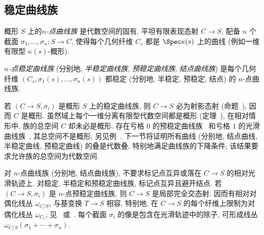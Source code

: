 \subsection{稳定曲线族}\label{src:6.3.4-subsection}
\begin{definition}\label{src:6.3.20}
概形 $S$ 上的\textit{$n$-点曲线族} 是代数空间的固有, 平坦有限表现态射 $C\to\allowbreak S$, 配备 $n$ 个截面 $\sigma_1,\allowbreak \ldots,\allowbreak \sigma_n:S\to\allowbreak C$, 使得每个几何纤维 $C_s$ 都是 $\Spec\kappa(s)$ 上的曲线 (例如一维有限型 $\kappa(s)$-概形).

\textit{$n$-点稳定曲线族} (分别地, \textit{半稳定曲线族}, \textit{预稳定曲线族}, \textit{结点曲线族}) 是每个几何纤维 $(C_s,\allowbreak \sigma_1(s),\allowbreak \ldots,\allowbreak \sigma_n(s))$ 都稳定 (分别地, 半稳定, 预稳定, 结点) 的 $n$-点曲线族.
\end{definition}
\begin{remark}[注意]\label{src:6.3.21}
若 $(C\to\allowbreak S,\allowbreak \sigma_i)$ 是概形 $S$ 上的稳定曲线族, 则 $C\to\allowbreak S$ 必为射影态射 (命题~), 因而 $C$ 是概形. 虽然域上每个一维分离有限型代数空间都是概形 (定理~), 在相对情形中, 族的总空间 $C$ 却未必是概形. 存在亏格 $0$ 的预稳定曲线族~\cite[例 2.3]{Ful10} 和亏格 $1$ 的光滑曲线族~\cite[XIII.3.2]{Ray70}, 其总空间不是概形; 另见例~. 下一节将证明所有曲线 (分别地, 结点曲线, 半稳定曲线, 预稳定曲线) 的叠是代数叠, 特别地满足曲线族的下降条件; 该结果要求允许族的总空间为代数空间.
\end{remark}
对 $n$-点曲线族 (分别地, 结点曲线族), 不要求标记点互异或落在 $C\to\allowbreak S$ 的相对光滑轨迹上. 对稳定, 半稳定和预稳定曲线族, 标记点互异且避开结点. 若 $(C\to\allowbreak S,\allowbreak \sigma_i)$ 是 $n$-点预稳定曲线族, 则 $C\to\allowbreak S$ 是局部完全交态射. 因而有相对对偶化线丛 $\omega_{C/S}$, 与基变换 $T\to\allowbreak S$ 相容, 特别地, 在 $C\to\allowbreak S$ 的每个纤维上限制为对偶化线丛 $\omega_{C_s}$; 见~\cite{Har66c} 或~\cite[\S 6.4]{Liu02}. 每个截面 $\sigma_i$ 的像是包含在光滑轨迹中的除子, 可形成线丛 $\omega_{C/S}(\sigma_1+\cdots+\sigma_n)$.

